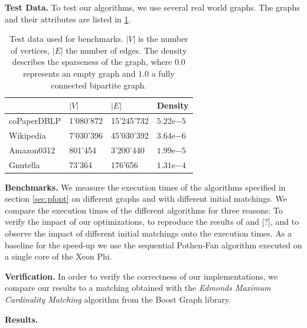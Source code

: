 \documentclass[letterpaper]{article}
\newcommand{\mypar}[1]{{\bf #1.}}
\begin{document}

\mypar{Test Data}
To test our algorithms, we use several real world graphs. The graphs and their attributes are listed in \ref{table:testdata}. 
\\
\begin{table}
\centering
\begin{tabular}{ |l|l|l|l| }
\hline
 & $\lvert V \rvert$ & $\lvert E \rvert$ & Density \\ \hline
coPaperDBLP & 1'080'872 & 15'245'732 & $5.22\mathrm{e}{-5}$ \\ \hline
Wikipedia & 7'030'396 & 45'030'392 & $3.64\mathrm{e}{-6}$ \\ \hline
Amazon0312 & 801'454 & 3'200'440 & $1.99\mathrm{e}{-5}$ \\ \hline
Gnutella & 73'364 & 176'656 & $1.31\mathrm{e}{-4}$ \\ \hline
\end{tabular}
\caption{Test data used for benchmarks. $\lvert V \rvert$ is the number of vertices, $\lvert E \rvert$ the number of edges. The density describes the sparseness of the graph, where $0.0$ represents an empty graph and $1.0$ a fully connected bipartite graph.}
\label{table:testdata}
\end{table}

\mypar{Benchmarks}
We measure the execution times of the algorithms specified in section \ref{sec:pfopt} on different graphs and with different initial matchings. We compare the execution times of the different algorithms for three reasons: To verify the impact of our optimizations, to reproduce the results of \cite{Azad:2012} and [?], and to observe the impact of different initial matchings onto the execution times. As a baseline for the speed-up we use the sequential Pothen-Fan algorithm executed on a single core of the Xeon Phi.

\mypar{Verification}
In order to verify the correctness of our implementations, we compare our results to a matching obtained with the \textit{Edmonds Maximum Cardinality Matching} algorithm \cite{BoostEdmonds} from the Boost Graph library.

\mypar{Results}
%
\end{document}
